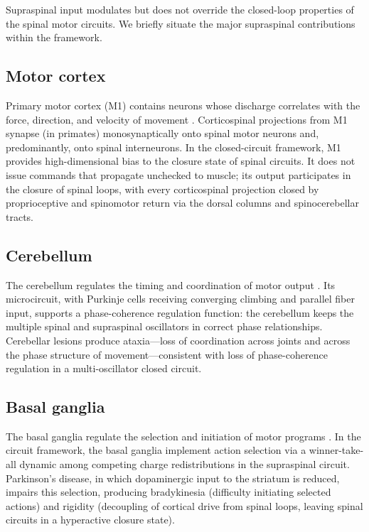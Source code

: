 \documentclass[11pt,twocolumn,a4paper]{article}
\theoremstyle{definition}
\theoremstyle{remark}
\begin{document}
Supraspinal input modulates but does not override the closed-loop
properties of the spinal motor circuits. We briefly situate the
major supraspinal contributions within the framework.

\subsection{Motor cortex}

Primary motor cortex (M1) contains neurons whose discharge correlates
with the force, direction, and velocity of movement
\citep{georgopoulos1986,evarts1968}. Corticospinal projections from
M1 synapse (in primates) monosynaptically onto spinal motor neurons
and, predominantly, onto spinal interneurons. In the closed-circuit
framework, M1 provides high-dimensional bias to the closure state of
spinal circuits. It does not issue commands that propagate unchecked
to muscle; its output participates in the closure of spinal loops,
with every corticospinal projection closed by proprioceptive and
spinomotor return via the dorsal columns and spinocerebellar tracts.

\subsection{Cerebellum}

The cerebellum regulates the timing and coordination of motor output
\citep{ivry1989,thach1992}. Its microcircuit, with Purkinje cells
receiving converging climbing and parallel fiber input, supports a
phase-coherence regulation function: the cerebellum keeps the multiple
spinal and supraspinal oscillators in correct phase relationships.
Cerebellar lesions produce ataxia---loss of coordination across joints
and across the phase structure of movement---consistent with loss of
phase-coherence regulation in a multi-oscillator closed circuit.

\subsection{Basal ganglia}

The basal ganglia regulate the selection and initiation of motor
programs \citep{redgrave1999,graybiel2005}. In the circuit framework,
the basal ganglia implement action selection via a winner-take-all
dynamic among competing charge redistributions in the supraspinal
circuit. Parkinson's disease, in which dopaminergic input to the
striatum is reduced, impairs this selection, producing bradykinesia
(difficulty initiating selected actions) and rigidity (decoupling of
cortical drive from spinal loops, leaving spinal circuits in a
hyperactive closure state).
\end{document}
